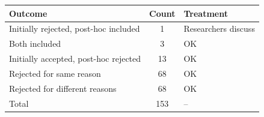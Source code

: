 \begin{tabular}{lcl}
\toprule
Outcome & Count & Treatment \\
\midrule
Initially rejected, post-hoc included & 1 & Researchers discuss \\
Both included & 3 & OK \\
Initially accepted, post-hoc rejected & 13 & OK \\
Rejected for same reason & 68 & OK \\
Rejected for different reasons & 68 & OK \\
\midrule
Total & 153 & -- \\
\bottomrule
\end{tabular}